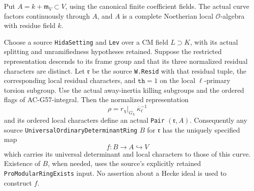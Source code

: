 \begin{lemma}
\label{AC-G61-pair}
Put \(A=k+\mathfrak m_V\subset V\), using the canonical finite
coefficient fields.  The actual curve factors continuously through
\(A\), and \(A\) is a complete Noetherian local
\(\mathcal O\)-algebra with residue field \(k\).

Choose a source \texttt{HidaSetting} and \texttt{Lev} over a CM
field \(L\supset K\), with its actual splitting and unramifiedness
hypotheses retained.  Suppose the restricted representation descends
to its frame group and that its three normalized residual characters
are distinct.  Let \(\mathfrak r\) be the source
\texttt{W.Resid} with that residual tuple, the corresponding local
residual characters, and \(\texttt{th}=1\) on the local
\(\ell\)-primary torsion subgroup.  Use the actual away-inertia
killing subgroups and the ordered flags of AC-G57-integral.
Then the normalized representation
\[
             \rho=r_\chi|_{G_L}\,\overline\kappa_\ell^{-1}
 \tag{G61.2}
\]
and its ordered local characters define an actual
\texttt{Pair} \((\mathfrak r,A)\).
Consequently any source
\texttt{UniversalOrdinaryDeterminantRing} \(B\) for
\(\mathfrak r\) has the uniquely specified map
\[
       f:B\longrightarrow A\hookrightarrow V
 \tag{G61.3}
\]
which carries its universal determinant and local characters to
those of this curve.  Existence of \(B\), when needed, uses the
source's explicitly retained \texttt{ProModularRingExists} input.
No assertion about a Hecke ideal is used to construct \(f\).
\end{lemma}
